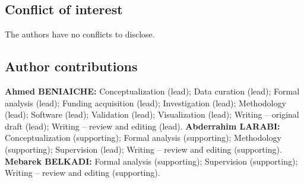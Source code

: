 \documentclass[11pt,a4paper]{article}
\begin{document}
\subsection*{Conflict of interest}
The authors have no conflicts to disclose.

\subsection*{Author contributions}
\textbf{Ahmed BENIAICHE:} Conceptualization (lead); Data curation (lead);
Formal analysis (lead); Funding acquisition (lead); Investigation (lead);
Methodology (lead); Software (lead); Validation (lead); Visualization (lead);
Writing -- original draft (lead); Writing -- review and editing (lead).
\textbf{Abderrahim LARABI:} Conceptualization (supporting); Formal analysis
(supporting); Methodology (supporting); Supervision (lead); Writing -- review and
editing (supporting).
\textbf{Mebarek BELKADI:} Formal analysis (supporting); Supervision (supporting);
Writing -- review and editing (supporting).
\end{document}
